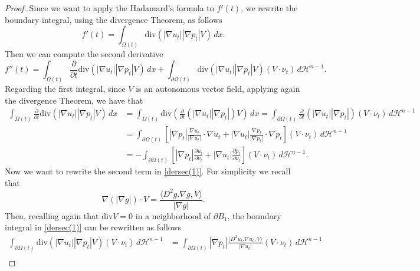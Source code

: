 \documentclass[10pt,a4paper]{amsart}
\newcommand{\abs}[1]{{\left|#1\right|}}
\begin{document}
\begin{proof}
  Since we want to apply the Hadamard's formula to $f'(t)$, we rewrite the boundary integral, using the divergence Theorem, as follows
\begin{equation*}
    f'(t)=\int_{\Omega(t)}\mathrm{div}(\abs{\nabla u_t}\abs{\nabla p_t}V)\,dx.
\end{equation*}
Then we can compute the second derivative
\begin{equation}\label{dersec(1)}
    f''(t)=\int_{\Omega(t)}\frac{\partial}{\partial t}\mathrm{div}(\abs{\nabla u_t}\abs{\nabla p_t}V)\,dx+\int_{\partial\Omega(t)}\mathrm{div}(\abs{\nabla u_t}\abs{\nabla p_t}V)(V\cdot\nu_t)\,d\mathcal{H}^{n-1}.
\end{equation}
Regarding the first integral, since $V$ is an autonomous vector field, applying again the divergence Theorem, we have that
\begin{equation}\label{parte1}
    \begin{split}
        \int_{\Omega(t)}\frac{\partial}{\partial t}\mathrm{div}(\abs{\nabla u_t}\abs{\nabla p_t}V)\,dx&=\int_{\Omega(t)}\mathrm{div}\left(\frac{\partial}{\partial t}(\abs{\nabla u_t}\abs{\nabla p_t})V\right)\,dx=\int_{\partial\Omega(t)}\frac{\partial}{\partial t}(\abs{\nabla u_t}\abs{\nabla p_t})(V\cdot\nu_t)\,d\mathcal{H}^{n-1}\\
        &=\int_{\partial\Omega(t)}\left[\abs{\nabla p_t}\frac{\nabla u_t}{\abs{\nabla u_t}}\cdot\nabla \dot{u}_t+\abs{\nabla u_t}\frac{\nabla p_t}{\abs{\nabla p_t}}\cdot\nabla \dot{p}_t \right](V\cdot\nu_t)\,d\mathcal{H}^{n-1}\\
        &=-\int_{\partial\Omega(t)}\left[\abs{\nabla p_t}\frac{\partial\dot{u}_t}{\partial\nu_t}+\abs{\nabla u_t}\frac{\partial\dot{p}_t}{\partial\nu_t} \right](V\cdot\nu_t)\,d\mathcal{H}^{n-1}.
    \end{split}
\end{equation}
Now we want to rewrite the second term in \eqref{dersec(1)}. For simplicity we recall that
\begin{equation*}
    \nabla(\abs{\nabla g})\cdot V=\frac{\langle D^2g.\nabla g, V\rangle}{\abs{\nabla g}}.
\end{equation*}
Then, recalling again that $\mathrm{div}V=0$ in a neighborhood of $\partial B_1$, the boundary integral in \eqref{dersec(1)} can be rewritten as follows
\begin{equation}\label{parte2}
    \begin{split}
        \int_{\partial\Omega(t)}\mathrm{div}(\abs{\nabla u_t}\abs{\nabla p_t}V)(V\cdot\nu_t)\,d\mathcal{H}^{n-1}&=\int_{\partial\Omega(t)}\abs{\nabla p_t}\frac{\langle D^2u_t.\nabla u_t, V\rangle}{\abs{\nabla u_t}}(V\cdot\nu_t)\,d\mathcal{H}^{n-1}\\

\end{split}
\end{equation}
\end{proof}
\end{document}
